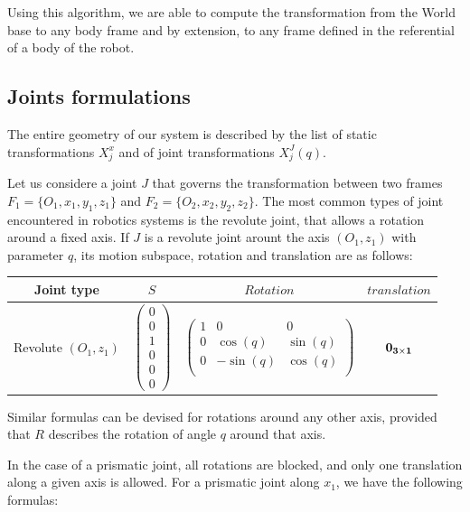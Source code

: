 Using this algorithm, we are able to compute the transformation from the World base to any body frame and by extension, to any frame defined in the referential of a body of the robot.

\subsection{Joints formulations}
\label{sub:joints_formulations}

The entire geometry of our system is described by the list of static transformations $X^x_j$ and of joint transformations $X^J_j(q)$.

Let us considere a joint $J$ that governs the transformation between two frames $F_1=\{O_1, x_1, y_1, z_1\}$ and $F_2=\{O_2, x_2, y_2, z_2\}$.
The most common types of joint encountered in robotics systems is the revolute joint, that allows a rotation around a fixed axis.
If $J$ is a revolute joint arount the axis $(O_1,z_1)$ with parameter $q$, its motion subspace, rotation and translation are as follows:

\begin{tabular}{|c|c|c|c|}
  \hline
  Joint type & $S$ & $Rotation$ & $translation$ \\
  \hline
  Revolute $(O_1,z_1)$
  &
  $\begin{pmatrix}
    0 \\ 0 \\ 1 \\ 0 \\ 0 \\ 0
  \end{pmatrix}$
  &
  $\begin{pmatrix}
    1 & 0 & 0 \\
    0 & \cos(q) & \sin(q) \\
    0 & -\sin(q) & \cos(q) \\
  \end{pmatrix}$
  &
  $\bf{0}_{3\times1}$
  \\
  \hline
\end{tabular}

Similar formulas can be devised for rotations around any other axis, provided that $R$ describes the rotation of angle $q$ around that axis.

In the case of a prismatic joint, all rotations are blocked, and only one translation along a given axis is allowed.
For a prismatic joint along $x_1$, we have the following formulas:


